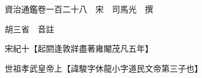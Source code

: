 










 


 
 


 

  
  
  
  
  





  
  
  
  
  
 
  

  

  
  
  



  

 
 

  
   




  

  
  


  　　資治通鑑卷一百二十八　宋　司馬光　撰

　　胡三省　音註

　　宋紀十【起閼逢敦牂盡著雍閹茂凡五年】

　　世祖孝武皇帝上【諱駿字休龍小字道民文帝第三子也】

